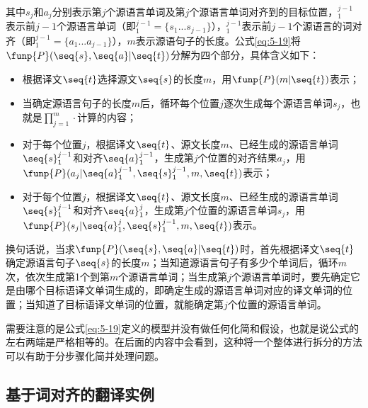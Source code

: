 \noindent  其中$s_j$和$a_j$分别表示第$j$个源语言单词及第$j$个源语言单词对齐到的目标位置，${{}_1^{j-1}}$表示前$j-1$个源语言单词（即${}_1^{j-1}=\{ s_1...s_{j-1} \}$），${}_1^{j-1}$表示前$j-1$个源语言的词对齐（即${}_1^{j-1}=\{ a_1...a_{j-1} \}$），$m$表示源语句子的长度。公式\eqref{eq:5-19}将$\funp{P}(\seq{s},\seq{a}|\seq{t})$分解为四个部分，具体含义如下：

\begin{itemize}
\vspace{0.5em}
\item 根据译文$\seq{t}$选择源文$\seq{s}$的长度$m$，用$\funp{P}(m|\seq{t})$表示；
\vspace{0.5em}
\item 当确定源语言句子的长度$m$后，循环每个位置$j$逐次生成每个源语言单词$s_j$，也就是$\prod_{j=1}^m \cdot$计算的内容；
\vspace{0.5em}
\item 对于每个位置$j$，根据译文$\seq{t}$、源文长度$m$、已经生成的源语言单词$\seq{s}_1^{j-1}$和对齐$\seq{a}_1^{j-1}$，生成第$j$个位置的对齐结果$a_j$，用$\funp{P}(a_j|\seq{a}_1^{j-1},\seq{s}_1^{j-1},m,\seq{t})$表示；
\vspace{0.5em}
\item 对于每个位置$j$，根据译文$\seq{t}$、源文长度$m$、已经生成的源语言单词$\seq{s}_1^{j-1}$和对齐$\seq{a}_1^j$，生成第$j$个位置的源语言单词$s_j$，用$\funp{P}(s_j|\seq{a}_1^{j},\seq{s}_1^{j-1},m,\seq{t})$表示。
\vspace{0.5em}
\end{itemize}
\parinterval 换句话说，当求$\funp{P}(\seq{s},\seq{a}|\seq{t})$时，首先根据译文$\seq{t}$确定源语言句子$\seq{s}$的长度$m$；当知道源语言句子有多少个单词后，循环$m$次，依次生成第1个到第$m$个源语言单词；当生成第$j$个源语言单词时，要先确定它是由哪个目标语译文单词生成的，即确定生成的源语言单词对应的译文单词的位置；当知道了目标语译文单词的位置，就能确定第$j$个位置的源语言单词。

\parinterval 需要注意的是公式\eqref{eq:5-19}定义的模型并没有做任何化简和假设，也就是说公式的左右两端是严格相等的。在后面的内容中会看到，这种将一个整体进行拆分的方法可以有助于分步骤化简并处理问题。


\subsection{基于词对齐的翻译实例}

